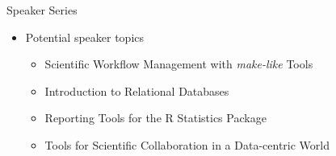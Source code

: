\documentclass[final]{beamer}
\begin{document}
\begin{frame}[t]
\begin{columns}[t]
\begin{column}{0.3\linewidth}
\begin{block}{Speaker Series}
\begin{figure}
\begin{subfigure}{.45\textwidth}
            \label{fig:sub2}
          \end{subfigure}
          \label{fig:test}
        \end{figure}
      {\small
      \begin{itemize}
      \item{Potential speaker topics}
        \begin{itemize}
        \item{Scientific Workflow Management with \textit{make-like} Tools}
        \item{Introduction to Relational Databases}
        \item{Reporting Tools for the R Statistics Package}
        \item{Tools for Scientific Collaboration in a Data-centric World}
        \end{itemize}
      \end{itemize}
      }
      \end{block}

    \end{column}


\end{columns}
\end{frame}
\end{document}
